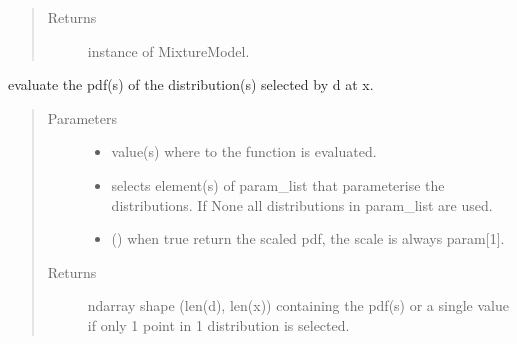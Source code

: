 \documentclass[letterpaper,10pt,english]{sphinxmanual}
\begin{document}
\begin{fulllineitems}
\begin{fulllineitems}
\begin{quote}
\begin{description}
\item[{Returns}] \leavevmode
\sphinxAtStartPar
instance of MixtureModel.

\end{description}\end{quote}

\end{fulllineitems}


\begin{fulllineitems}
\label{\detokenize{tes:tes.analysis.MixtureModel.pdf}}
\sphinxAtStartPar
evaluate the pdf(s) of the distribution(s) selected by d at x.
\begin{quote}\begin{description}
\item[{Parameters}] \leavevmode\begin{itemize}
\item {} 
\sphinxAtStartPar
{} \textendash{} value(s) where to the function is evaluated.

\item {} 
\sphinxAtStartPar
{} \textendash{} selects element(s) of param\_list that parameterise the
distributions. If None all distributions in param\_list are
used.

\item {} 
\sphinxAtStartPar
{} () \textendash{} when true return the scaled pdf, the scale is always
param{[}\sphinxhyphen{}1{]}.

\end{itemize}

\item[{Returns}] \leavevmode
\sphinxAtStartPar
ndarray shape (len(d), len(x)) containing the pdf(s) or a
single value if only 1 point in 1 distribution is selected.

\end{description}\end{quote}

\end{fulllineitems}


\end{fulllineitems}
\end{document}
